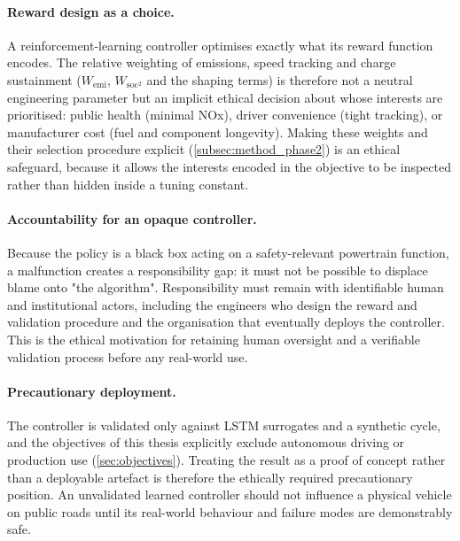\paragraph{Reward design as a choice.} A reinforcement-learning controller optimises exactly what its reward function encodes. The relative weighting of emissions, speed tracking and charge sustainment ($W_{\text{emi}}$, $W_{\text{soc}^2}$ and the shaping terms) is therefore not a neutral engineering parameter but an implicit ethical decision about whose interests are prioritised: public health (minimal \ac{NOx}), driver convenience (tight tracking), or manufacturer cost (fuel and component longevity). Making these weights and their selection procedure explicit (\autoref{subsec:method_phase2}) is an ethical safeguard, because it allows the interests encoded in the objective to be inspected rather than hidden inside a tuning constant.

\paragraph{Accountability for an opaque controller.} Because the policy is a black box acting on a safety-relevant powertrain function, a malfunction creates a responsibility gap: it must not be possible to displace blame onto "the algorithm". Responsibility must remain with identifiable human and institutional actors, including the engineers who design the reward and validation procedure and the organisation that eventually deploys the controller. This is the ethical motivation for retaining human oversight and a verifiable validation process before any real-world use.

\paragraph{Precautionary deployment.} The controller is validated only against \ac{LSTM} surrogates and a synthetic cycle, and the objectives of this thesis explicitly exclude autonomous driving or production use (\autoref{sec:objectives}). Treating the result as a proof of concept rather than a deployable artefact is therefore the ethically required precautionary position. An unvalidated learned controller should not influence a physical vehicle on public roads until its real-world behaviour and failure modes are demonstrably safe.

